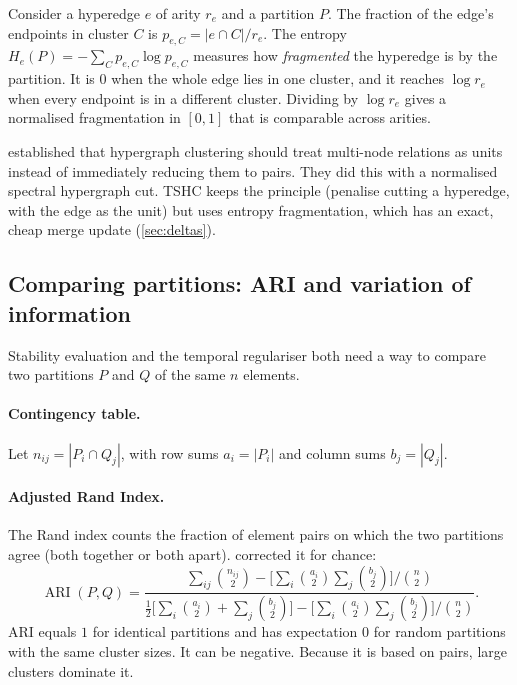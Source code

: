 \documentclass[11pt,a4paper]{article}
\newcommand{\cref}[1]{\autoref{#1}}
\theoremstyle{remark}
\newcommand{\ARI}{\operatorname{ARI}}
\begin{document}
Consider a hyperedge $e$ of arity $r_e$ and a partition $P$. The fraction of the
edge's endpoints in cluster $C$ is $p_{e,C}=|e\cap C|/r_e$. The entropy
$H_e(P)=-\sum_C p_{e,C}\log p_{e,C}$ measures how \emph{fragmented} the hyperedge is
by the partition. It is $0$ when the whole edge lies in one cluster, and it reaches
$\log r_e$ when every endpoint is in a different cluster. Dividing by $\log r_e$
gives a normalised fragmentation in $[0,1]$ that is comparable across arities.

\citet{zhou2006hypergraph} established that hypergraph clustering should treat
multi-node relations as units instead of immediately reducing them to pairs. They did
this with a normalised spectral hypergraph cut. TSHC keeps the principle (penalise
cutting a hyperedge, with the edge as the unit) but uses entropy fragmentation, which
has an exact, cheap merge update (\cref{sec:deltas}).

\subsection{Comparing partitions: ARI and variation of information}
\label{sec:bg-compare}

Stability evaluation and the temporal regulariser both need a way to compare two
partitions $P$ and $Q$ of the same $n$ elements.

\paragraph{Contingency table.}
Let $n_{ij}=|P_i\cap Q_j|$, with row sums $a_i=|P_i|$ and column sums $b_j=|Q_j|$.

\paragraph{Adjusted Rand Index.}
The Rand index counts the fraction of element pairs on which the two partitions
agree (both together or both apart). \citet{hubert1985} corrected it for chance:
\begin{equation}
\ARI(P,Q)=\frac{\sum_{ij}\binom{n_{ij}}{2}-\Big[\sum_i\binom{a_i}{2}\sum_j\binom{b_j}{2}\Big]\Big/\binom{n}{2}}
{\tfrac12\Big[\sum_i\binom{a_i}{2}+\sum_j\binom{b_j}{2}\Big]-\Big[\sum_i\binom{a_i}{2}\sum_j\binom{b_j}{2}\Big]\Big/\binom{n}{2}} .
\end{equation}
ARI equals $1$ for identical partitions and has expectation $0$ for random
partitions with the same cluster sizes. It can be negative. Because it is based on
pairs, large clusters dominate it.
\end{document}
